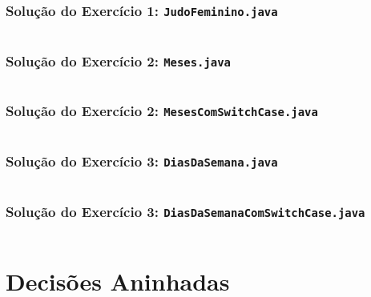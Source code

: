 \documentclass[xcolor={dvipsnames,table},aspectratio=169]{beamer}
\begin{document}
\begin{frame}\frametitle{Solução do Exercício 1: \texttt{JudoFeminino.java}}
	\scriptsize{\inputminted[bgcolor=cyan!10]{java}{src/JudoFeminino.java}}
\end{frame}

\begin{frame}\frametitle{Solução do Exercício 2: \texttt{Meses.java}}
	\tiny{\inputminted[bgcolor=cyan!10]{java}{src/Meses.java}}
\end{frame}

\begin{frame}\frametitle{Solução do Exercício 2: \texttt{MesesComSwitchCase.java}}
	\tiny{\inputminted[bgcolor=cyan!10]{java}{src/MesesComSwitchCase.java}}
\end{frame}

\begin{frame}\frametitle{Solução do Exercício 3: \texttt{DiasDaSemana.java}}
	\scriptsize{\inputminted[bgcolor=cyan!10]{java}{src/DiasDaSemana.java}}
\end{frame}

\begin{frame}\frametitle{Solução do Exercício 3: \texttt{DiasDaSemanaComSwitchCase.java}}
	\tiny{\inputminted[bgcolor=cyan!10]{java}{src/DiasDaSemanaComSwitchCase.java}}
\end{frame}

\section{Decisões Aninhadas}
\end{document}
